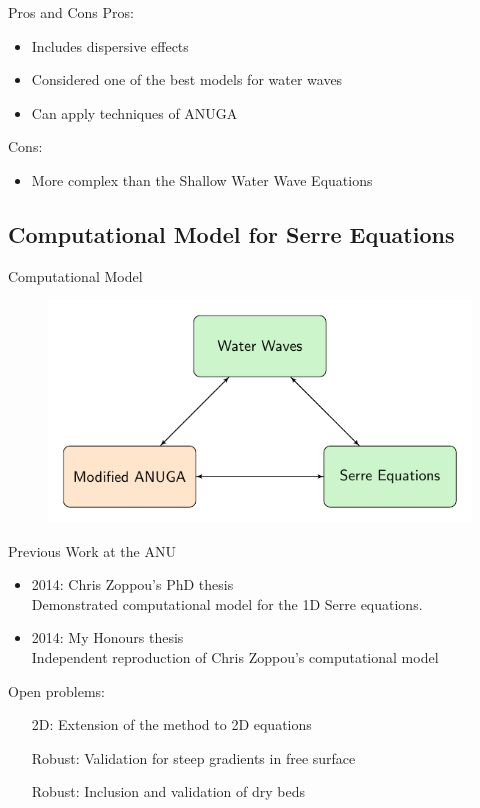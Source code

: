 \documentclass[]{beamer}
\begin{document}
\begin{frame}{Pros and Cons}
	Pros:
	\begin{itemize}
		\item Includes dispersive effects
		\item Considered one of the best models for water waves
		\item Can apply techniques of ANUGA
	\end{itemize}
	Cons:
	\begin{itemize}
		\item More complex than the Shallow Water Wave Equations
	\end{itemize}
\end{frame}
\subsection{Computational Model for Serre Equations}
\begin{frame}{Computational Model}
	\begin{figure}
		\includegraphics[width=\textwidth]{./Pics/ModelDiagrams/FlowChartSerre12G3O.pdf}
	\end{figure}
\end{frame}
\begin{frame}{Previous Work at the ANU}
	\begin{itemize}
		\item 2014: Chris Zoppou's PhD thesis  \\
			Demonstrated computational model for the 1D Serre equations.
		\item 2014: My Honours thesis \\
			Independent reproduction of Chris Zoppou's computational model
	\end{itemize}
	\pause
	Open problems:
	\begin{itemize}
		\item[2D:] Extension of the method to 2D equations
		\item[Robust:] Validation for steep gradients in free surface
		\item[Robust:] Inclusion and validation of dry beds
	\end{itemize}	
\end{frame}
\end{document}
